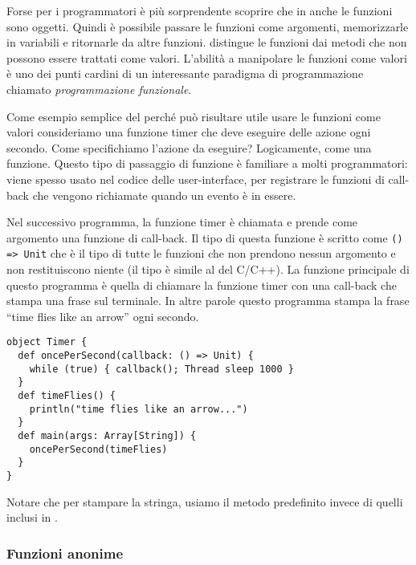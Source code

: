Forse per i programmatori \Java \`e pi\`u sorprendente scoprire che in \Scala anche le funzioni sono oggetti. Quindi \`e possibile passare le funzioni come argomenti, memorizzarle in variabili e ritornarle da altre funzioni. \Scala distingue le funzioni dai metodi che non possono essere trattati come valori. L'abilit\`a  a manipolare le funzioni come valori \`e uno dei punti cardini di un interessante paradigma di programmazione chiamato \emph{programmazione funzionale}.

Come esempio semplice del perch\'e pu\`o risultare utile usare le funzioni come valori consideriamo una funzione timer che deve eseguire delle azione ogni secondo. Come specifichiamo l'azione da eseguire? Logicamente, come una funzione. Questo tipo di passaggio di funzione \`e familiare a molti programmatori: viene spesso usato nel codice delle user-interface, per registrare le funzioni di call-back che vengono richiamate quando un evento \`e in essere.

Nel successivo programma, la funzione timer \`e chiamata  e prende come argomento una funzione di call-back. Il tipo di questa funzione \`e scritto come \verb|() => Unit| che \`e il tipo di tutte le funzioni che non prendono nessun argomento e non restituiscono niente (il tipo  \`e simile al  del C/C++). La funzione principale di questo programma \`e quella di chiamare la funzione timer con una call-back che stampa una frase sul terminale. In altre parole questo programma stampa la frase ``time flies like an arrow'' ogni secondo.
\begin{lstlisting}
object Timer {
  def oncePerSecond(callback: () => Unit) {
    while (true) { callback(); Thread sleep 1000 }
  }
  def timeFlies() {
    println("time flies like an arrow...")
  }
  def main(args: Array[String]) {
    oncePerSecond(timeFlies)
  }
}
\end{lstlisting}
Notare che per stampare la stringa, usiamo il metodo predefinito  invece di quelli inclusi in .

\subsubsection{Funzioni anonime}
\label{sec:anonymous-functions}

